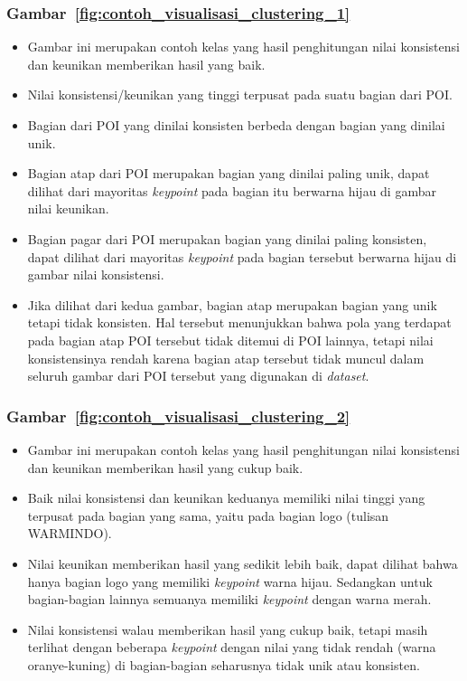 \subsubsection{Gambar~\ref{fig:contoh_visualisasi_clustering_1}}
\begin{itemize}
	\item Gambar ini merupakan contoh kelas yang hasil penghitungan nilai konsistensi dan keunikan memberikan hasil yang baik.
	\item Nilai konsistensi/keunikan yang tinggi terpusat pada suatu bagian dari POI.
	\item Bagian dari POI yang dinilai konsisten berbeda dengan bagian yang dinilai unik. 
	\item Bagian atap dari POI merupakan bagian yang dinilai paling unik, dapat dilihat dari mayoritas \textit{keypoint} pada bagian itu berwarna hijau di gambar nilai keunikan.
	\item Bagian pagar dari POI merupakan bagian yang dinilai paling konsisten, dapat dilihat dari mayoritas \textit{keypoint} pada bagian tersebut berwarna hijau di gambar nilai konsistensi.
	\item Jika dilihat dari kedua gambar, bagian atap merupakan bagian yang unik tetapi tidak konsisten. Hal tersebut menunjukkan bahwa pola yang terdapat pada bagian atap POI tersebut tidak ditemui di POI lainnya, tetapi nilai konsistensinya rendah karena bagian atap tersebut tidak muncul dalam seluruh gambar dari POI tersebut yang digunakan di \textit{dataset}. 
\end{itemize}
\subsubsection{Gambar~\ref{fig:contoh_visualisasi_clustering_2}}
\begin{itemize}
	\item Gambar ini merupakan contoh kelas yang hasil penghitungan nilai konsistensi dan keunikan memberikan hasil yang cukup baik.
	\item Baik nilai konsistensi dan keunikan keduanya memiliki nilai tinggi yang terpusat pada bagian yang sama, yaitu pada bagian logo (tulisan WARMINDO).
	\item Nilai keunikan memberikan hasil yang sedikit lebih baik, dapat dilihat bahwa hanya bagian logo yang memiliki \textit{keypoint} warna hijau. Sedangkan untuk bagian-bagian lainnya semuanya memiliki \textit{keypoint} dengan warna merah.
	\item Nilai konsistensi walau memberikan hasil yang cukup baik, tetapi masih terlihat dengan beberapa \textit{keypoint} dengan nilai yang tidak rendah (warna oranye-kuning) di bagian-bagian seharusnya tidak unik atau konsisten.
\end{itemize}
